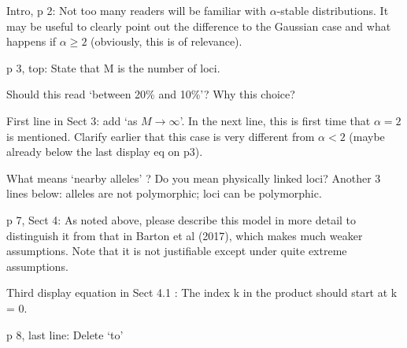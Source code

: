 \begin{point}{}
Intro, p 2: Not too many readers will be familiar with $\alpha$-stable distributions. It may be
useful to clearly point out the difference to the Gaussian case and what happens if $\alpha \ge 2$
(obviously, this is of relevance).
\end{point}

\reply{
}

\begin{point}{}
p 3, top: State that M is the number of loci.
\end{point}

\reply{
}

\begin{point}{\revref}
Should this read ‘between 20\% and 10\%’? Why this choice?
\end{point}

\reply{
}

\begin{point}{\revref}
First line in Sect 3: add ‘as $M \to \infty$’. In the next line, this is first time that $\alpha = 2$ is
mentioned. Clarify earlier that this case is very different from $\alpha < 2$ (maybe already below
the last display eq on p3).
\end{point}

\reply{
}

\begin{point}{\revref}
What means ‘nearby alleles’ ? Do you mean physically linked
loci? Another 3 lines below: alleles are not polymorphic; loci can be polymorphic.
\end{point}

\reply{
}

\begin{point}{}
p 7, Sect 4: As noted above, please describe this model in more detail to distinguish it
from that in Barton et al (2017), which makes much weaker assumptions. Note that it is
not justifiable except under quite extreme assumptions.
\end{point}

\reply{
}

\begin{point}{}
Third display equation in Sect 4.1 \revref: The index k in the product should start at k = 0.
\end{point}

\reply{
}

\begin{point}{}
p 8, last line: Delete ‘to’
\end{point}

